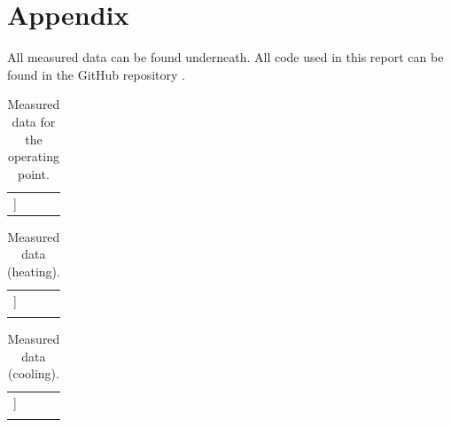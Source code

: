 \documentclass[a4paper]{article}
\begin{document}
\newpage
\section{Appendix}

All measured data can be found underneath.
\newline
All code used in this report can be found in the GitHub repository \cite{github}.

\begin{table}[H]
\centering
\begin{tabular}{r|rr|r}
\hline
[[table:operatingPoint]]
\end{tabular}
\caption{Measured data for the operating point.}
\label{tab:operating_point}
\end{table}

\begin{longtable}{r|rrr} 
\hline
[[table:data:heating]] \\
\caption{Measured data (heating).}
\label{tab:heating}
\end{longtable}

\begin{longtable}{r|rrr} 
\hline
[[table:data:cooling]] \\
\caption{Measured data (cooling).}
\label{tab:cooling}
\end{longtable}
\end{document}
